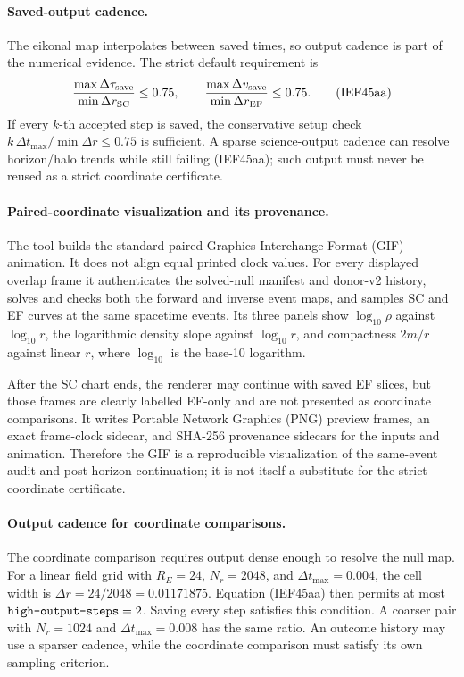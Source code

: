 \paragraph{Saved-output cadence.}
The eikonal map interpolates between saved times, so output cadence is part of
the numerical evidence.  The strict default requirement is
\[
 \frac{\max\Delta\tau_{\rm save}}{\min\Delta r_{\rm SC}}\le0.75,
 \qquad
 \frac{\max\Delta v_{\rm save}}{\min\Delta r_{\rm EF}}\le0.75. \tag{IEF45aa}
\]
If every \(k\)-th accepted step is saved, the conservative setup check
\(k\,\Delta t_{\max}/\min\Delta r\le0.75\) is sufficient.  A sparse
science-output cadence can resolve horizon/halo trends while still failing
(IEF45aa); such output must never be reused as a strict coordinate
certificate.

\paragraph{Paired-coordinate visualization and its provenance.}
The tool
builds the standard paired Graphics Interchange Format (GIF) animation.  It
does not align equal printed clock values.  For every displayed overlap frame
it authenticates the solved-null manifest and donor-v2 history, solves and
checks both the forward and inverse event maps, and samples SC and EF curves
at the same spacetime events.  Its three panels show
\(\log_{10}\rho\) against \(\log_{10}r\), the logarithmic density slope
against \(\log_{10}r\), and compactness \(2m/r\) against linear \(r\), where
\(\log_{10}\) is the base-10 logarithm.

After the SC chart ends, the renderer may continue with saved EF slices, but
those frames are clearly labelled EF-only and are not presented as coordinate
comparisons.  It writes Portable Network Graphics (PNG) preview frames, an
exact frame-clock sidecar, and SHA-256 provenance sidecars for the inputs and
animation.  Therefore the GIF is a reproducible visualization of the
same-event audit and post-horizon continuation; it is not itself a substitute
for the strict coordinate certificate.

\paragraph{Output cadence for coordinate comparisons.}
The coordinate comparison requires output dense enough to resolve the null
map. For a linear field grid with \(R_E=24\), \(N_r=2048\), and
\(\Delta t_{\max}=0.004\), the cell width is
\(\Delta r=24/2048=0.01171875\). Equation (IEF45aa) then permits
at most \(\code{high-output-steps}=2\). Saving every step satisfies
this condition. A coarser pair with \(N_r=1024\) and
\(\Delta t_{\max}=0.008\) has the same ratio. An outcome history may
use a sparser cadence, while the coordinate comparison must satisfy its
own sampling criterion.

